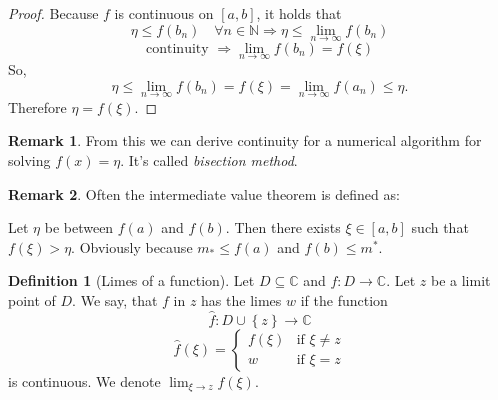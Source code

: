 \documentclass[a4paper,landscape,twocolumn]{article}
\theoremstyle{definition}
\newtheorem{defi}{Definition}
\newtheorem{rem}{Remark}
\newcommand\set[1]{\left\{#1\right\}}
\begin{document}
\begin{proof}
  Because $f$ is continuous on $[a, b]$, it holds that
  \[ \eta \leq f(b_n) \quad\forall n \in \mathbb N \Rightarrow \eta \leq \lim_{n\to\infty} f(b_n) \]
  \[ \text{continuity } \Rightarrow \lim_{n\to\infty} f(b_n) = f(\xi) \]
  So,
  \[ \eta \leq \lim_{n\to\infty} f(b_n) = f(\xi) = \lim_{n\to\infty} f(a_n) \leq \eta. \]
  Therefore $\eta = f(\xi)$.
\end{proof}
\begin{rem}
  From this we can derive continuity for a numerical algorithm for solving $f(x) = \eta$.
  It's called \emph{bisection method}.
\end{rem}
\begin{rem}
  Often the intermediate value theorem is defined as:

  Let $\eta$ be between $f(a)$ and $f(b)$. Then there exists $\xi \in [a, b]$
  such that $f(\xi) > \eta$. Obviously because $m_* \leq f(a)$ and $f(b) \leq m^*$.
\end{rem}
\begin{defi}[Limes of a function]
  Let $D \subseteq \mathbb C$ and $f: D \to \mathbb C$. Let $z$ be a limit point of $D$.
  We say, that $f$ in $z$ has the limes $w$ if the function
  \[
    \hat{f}: D \cup \set{z} \to \mathbb C
  \] \[
    \hat{f}(\xi) = \begin{cases}
      f(\xi) & \text{if } \xi \neq z \\
      w & \text{if } \xi = z
    \end{cases}
  \]
  is continuous. We denote $\lim_{\xi \to z} f(\xi)$.
\end{defi}
\end{document}
